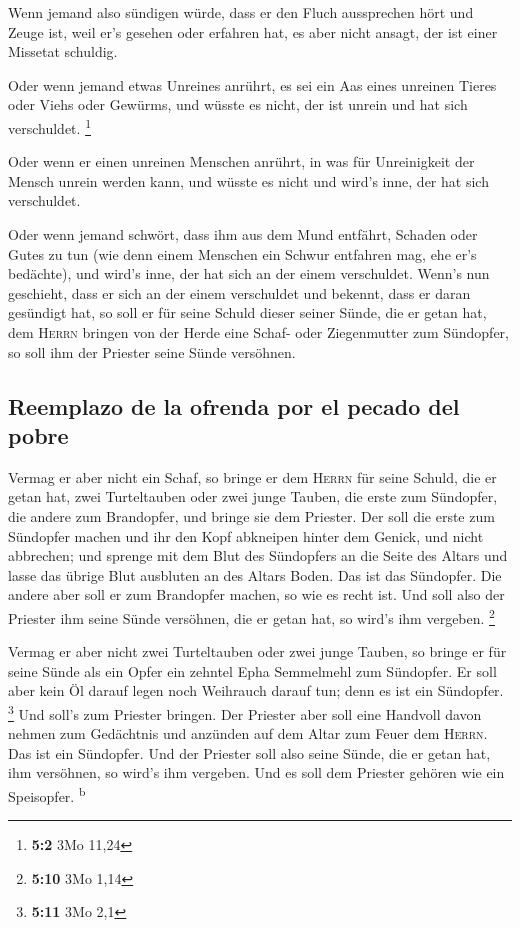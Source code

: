  Wenn jemand also sündigen würde, dass er den Fluch
aussprechen hört und Zeuge ist, weil er's gesehen oder erfahren hat, es
aber nicht ansagt, der ist einer Missetat schuldig.

 Oder wenn jemand etwas Unreines anrührt, es sei ein Aas
eines unreinen Tieres oder Viehs oder Gewürms, und wüsste es nicht, der
ist unrein und hat sich verschuldet. \footnote{\textbf{5:2} 3Mo 11,24}

 Oder wenn er einen unreinen Menschen anrührt, in was für
Unreinigkeit der Mensch unrein werden kann, und wüsste es nicht und
wird's inne, der hat sich verschuldet.

 Oder wenn jemand schwört, dass ihm aus dem Mund entfährt,
Schaden oder Gutes zu tun (wie denn einem Menschen ein Schwur entfahren
mag, ehe er's bedächte), und wird's inne, der hat sich an der einem
verschuldet.  Wenn's nun geschieht, dass er sich an der
einem verschuldet und bekennt, dass er daran gesündigt hat,
 so soll er für seine Schuld dieser seiner Sünde, die er
getan hat, dem \textsc{Herrn} bringen von der Herde eine Schaf- oder
Ziegenmutter zum Sündopfer, so soll ihm der Priester seine Sünde
versöhnen.

\hypertarget{reemplazo-de-la-ofrenda-por-el-pecado-del-pobre}{%
\subsection{Reemplazo de la ofrenda por el pecado del
pobre}\label{reemplazo-de-la-ofrenda-por-el-pecado-del-pobre}}

 Vermag er aber nicht ein Schaf, so bringe er dem
\textsc{Herrn} für seine Schuld, die er getan hat, zwei Turteltauben
oder zwei junge Tauben, die erste zum Sündopfer, die andere zum
Brandopfer,  und bringe sie dem Priester. Der soll die
erste zum Sündopfer machen und ihr den Kopf abkneipen hinter dem Genick,
und nicht abbrechen;  und sprenge mit dem Blut des
Sündopfers an die Seite des Altars und lasse das übrige Blut ausbluten
an des Altars Boden. Das ist das Sündopfer.  Die andere
aber soll er zum Brandopfer machen, so wie es recht ist. Und soll also
der Priester ihm seine Sünde versöhnen, die er getan hat, so wird's ihm
vergeben. \footnote{\textbf{5:10} 3Mo 1,14}

 Vermag er aber nicht zwei Turteltauben oder zwei junge
Tauben, so bringe er für seine Sünde als ein Opfer ein zehntel Epha
Semmelmehl zum Sündopfer. Er soll aber kein Öl darauf legen noch
Weihrauch darauf tun; denn es ist ein Sündopfer. \footnote{\textbf{5:11}
  3Mo 2,1}  Und soll's zum Priester bringen. Der Priester
aber soll eine Handvoll davon nehmen zum Gedächtnis und anzünden auf dem
Altar zum Feuer dem \textsc{Herrn}. Das ist ein Sündopfer.
 Und der Priester soll also seine Sünde, die er getan
hat, ihm versöhnen, so wird's ihm vergeben. Und es soll dem Priester
gehören wie ein Speisopfer. \textsuperscript{b}

